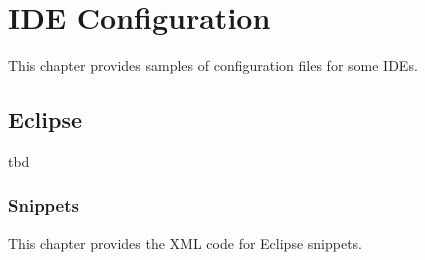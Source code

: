 \documentclass[12pt,a4paper,titlepage, parskip=half, headsepline, footsepline, cleardoubleplain]{scrbook}
\begin{document}
\renewcommand{\cellalign}{tl}

\section{IDE Configuration}\label{sec:IDEConfiguration}
This chapter provides samples of configuration files for some IDEs.

\subsection{Eclipse}\label{sec:EclipseConfiguration}
tbd

\subsubsection{Snippets}
This chapter provides the XML code for Eclipse snippets.
\end{document}
